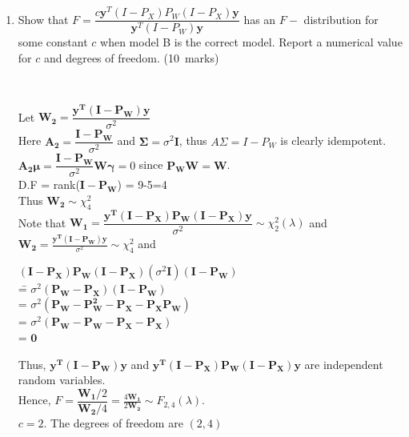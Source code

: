 \documentclass[soln,12pt]{utarexam}
\begin{document}
\begin{enumerate}
\begin{enumerate}
  \item Show that $F = \dfrac{c\mathbf{y}^T(I-P_X)P_W(I-P_X)\mathbf{y}}{\mathbf{y}^T(I-P_W)\mathbf{y}}$ has an $F-$ distribution for some constant $c$ when model B is the correct model. Report a numerical value for $c$ and degrees of freedom. \hfill(10~marks)
    \begin{answer}~


      Let $\mathbf{W_2} = \dfrac{\mathbf{y^T(I-P_W)y}}{\sigma^2}$\\
      Here $\mathbf{A_2} = \dfrac{\mathbf{I-P_W}}{\sigma^2}$ and $\bm{\Sigma} = \sigma^2\mathbf{I}$, thus $A\Sigma = I-P_W$ is clearly idempotent. \\
$\mathbf{A_2}\bm{\mu} = \dfrac{\mathbf{I-P_W}}{\sigma^2}\mathbf{W}\bm{\gamma} = 0$ since $\mathbf{P_WW} = \mathbf{W}$. \\
D.F = rank($\mathbf{I-P_W}$) = 9-5=4\\ 
Thus $\mathbf{W_2} \sim \chi_4^2$\\ 
      Note that $\mathbf{W_1} = \dfrac{\mathbf{y^T(I-P_X)P_W(I-P_X)y}}{\sigma^2} \sim \chi^2_2(\lambda)$ and\\
 $\mathbf{W_2} = \frac{\mathbf{y^T(I-P_W)y}}{\sigma^2} \sim \chi^2_4$ and 
      \begin{tabbing}
        $\mathbf{(I-P_X)P_W(I-P_X)}(\sigma^2\mathbf{I})\mathbf{(I-P_W)}$\\
        \== $\sigma^2\mathbf{(P_W-P_X)(I-P_W)}$\\
        \>= $\sigma^2\mathbf{(P_W -P_W^2 -P_X -P_XP_W)}$\\
        \>= $\sigma^2\mathbf{(P_W-P_W-P_X-P_X)}$\\
        \>= $\mathbf{0}$
      \end{tabbing}
      Thus, $\mathbf{y^T(I-P_W)y}$ and $\mathbf{y^T(I-P_X)P_W(I-P_X)y}$ are independent random variables.\\
      Hence, $F = \dfrac{\mathbf{W_1}/2}{\mathbf{W_2}/4} = \frac{4\mathbf{W_1}}{2\mathbf{W_2}} \sim F_{2,4}(\lambda)$.\\
     $c = 2$. The degrees of freedom are $(2,4)$
      
    \end{answer}
\end{enumerate}




\end{enumerate}
\end{document}
